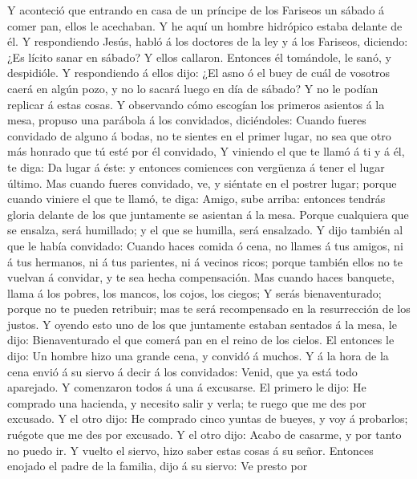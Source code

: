  Y aconteció que entrando en casa de un príncipe de los
Fariseos un sábado á comer pan, ellos le acechaban.  Y he
aquí un hombre hidrópico estaba delante de él.  Y
respondiendo Jesús, habló á los doctores de la ley y á los Fariseos,
diciendo: ¿Es lícito sanar en sábado?  Y ellos callaron.
Entonces él tomándole, le sanó, y despidióle.  Y
respondiendo á ellos dijo: ¿El asno ó el buey de cuál de vosotros caerá
en algún pozo, y no lo sacará luego en día de sábado?  Y no
le podían replicar á estas cosas.  Y observando cómo
escogían los primeros asientos á la mesa, propuso una parábola á los
convidados, diciéndoles:  Cuando fueres convidado de alguno
á bodas, no te sientes en el primer lugar, no sea que otro más honrado
que tú esté por él convidado,  Y viniendo el que te llamó á
ti y á él, te diga: Da lugar á éste: y entonces comiences con vergüenza
á tener el lugar último.  Mas cuando fueres convidado, ve,
y siéntate en el postrer lugar; porque cuando viniere el que te llamó,
te diga: Amigo, sube arriba: entonces tendrás gloria delante de los que
juntamente se asientan á la mesa.  Porque cualquiera que se
ensalza, será humillado; y el que se humilla, será ensalzado.
 Y dijo también al que le había convidado: Cuando haces
comida ó cena, no llames á tus amigos, ni á tus hermanos, ni á tus
parientes, ni á vecinos ricos; porque también ellos no te vuelvan á
convidar, y te sea hecha compensación.  Mas cuando haces
banquete, llama á los pobres, los mancos, los cojos, los ciegos;
 Y serás bienaventurado; porque no te pueden retribuir; mas
te será recompensado en la resurrección de los justos.  Y
oyendo esto uno de los que juntamente estaban sentados á la mesa, le
dijo: Bienaventurado el que comerá pan en el reino de los cielos.
 El entonces le dijo: Un hombre hizo una grande cena, y
convidó á muchos.  Y á la hora de la cena envió á su siervo
á decir á los convidados: Venid, que ya está todo aparejado.
 Y comenzaron todos á una á excusarse. El primero le dijo:
He comprado una hacienda, y necesito salir y verla; te ruego que me des
por excusado.  Y el otro dijo: He comprado cinco yuntas de
bueyes, y voy á probarlos; ruégote que me des por excusado.
 Y el otro dijo: Acabo de casarme, y por tanto no puedo ir.
 Y vuelto el siervo, hizo saber estas cosas á su señor.
Entonces enojado el padre de la familia, dijo á su siervo: Ve presto por
